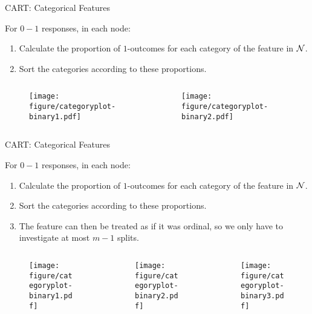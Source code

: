 \documentclass[11pt,compress,t,notes=noshow, xcolor=table]{beamer}
\begin{document}
  \begin{vbframe}{CART: Categorical Features}

For $0-1$ responses, in each node:
  \begin{enumerate}
  \item Calculate the proportion of $1$-outcomes for each category of the feature in $\mathcal{N}$.
  \item Sort the categories according to these proportions.
  \end{enumerate}
  \begin{columns}
  \begin{column}{0.33\textwidth}
  \begin{figure}
  \texttt{[image: figure/categoryplot-binary1.pdf]} 
  \end{figure}
  \end{column}
  \begin{column}{0.33\textwidth}
  \begin{figure}
  \texttt{[image: figure/categoryplot-binary2.pdf]} 
  \end{figure}
  \end{column}
  \begin{column}{0.33\textwidth}
  \end{column}
  \end{columns}

\end{vbframe}

  \begin{vbframe}{CART: Categorical Features}

For $0-1$ responses, in each node:
  \begin{enumerate}
  \item Calculate the proportion of $1$-outcomes for each category of the feature in $\mathcal{N}$.
  \item Sort the categories according to these proportions.
  \item The feature can then be treated as if it was ordinal, so we only have to investigate at most $m-1$ splits.
  \end{enumerate}
  \begin{columns}
  \begin{column}{0.33\textwidth}
  \begin{figure}
  \texttt{[image: figure/categoryplot-binary1.pdf]} 
  \end{figure}
  \end{column}
  \begin{column}{0.33\textwidth}
  \begin{figure}
  \texttt{[image: figure/categoryplot-binary2.pdf]} 
  \end{figure}
  \end{column}
  \begin{column}{0.33\textwidth}
  \begin{figure}
  \texttt{[image: figure/categoryplot-binary3.pdf]} 
  \end{figure}
  \end{column}
  \end{columns}

\end{vbframe}
\end{document}
